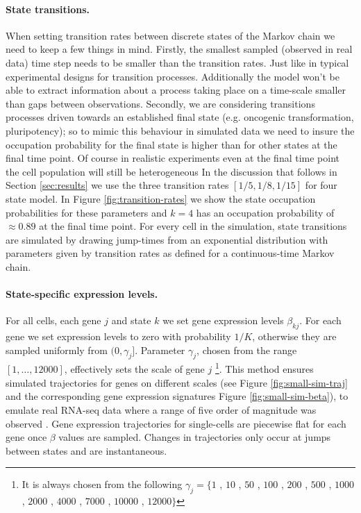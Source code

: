 \paragraph{State transitions.}
\label{sec:state-transitions}
When setting transition rates between discrete states of the Markov chain we need to keep a few things in mind. Firstly, the smallest sampled (observed in real data) time step needs to be smaller than the transition rates. Just like in typical experimental designs for transition processes. Additionally the model won't be able to extract information about a process taking place on a time-scale smaller than gaps between observations. Secondly, we are considering transitions processes driven towards an established final state (e.g. oncogenic transformation, pluripotency); so to mimic this behaviour in simulated data we need to insure the occupation probability for the final state is higher than for other states at the final time point. Of course in realistic experiments even at the final time point the cell population will still be heterogeneous In the discussion that follows in Section \ref{sec:results} we use the three transition rates $[1/5, 1/8, 1/15]$ for four state model. In Figure \ref{fig:transition-rates} we show the state occupation probabilities for these parameters and $k=4$ has an occupation probability of $\approx 0.89$ at the final time point. For every cell in the simulation, state transitions are simulated by drawing jump-times from an exponential distribution with parameters given by transition rates as defined for a continuous-time Markov chain.

\paragraph{State-specific expression levels.}
\label{sec:state-spec-expr}
For all cells, each gene $j$ and state $k$ we set gene expression levels $\beta_{kj}$. For each gene we set expression levels to zero with probability $1/K$, otherwise they are sampled uniformly from $(0, \gamma_j]$. Parameter $\gamma_j$, chosen from the range $[1, \ldots, 12000]$, effectively sets the scale of gene $j$ \footnote{It is always chosen from the following $\gamma_j = \lbrace 1$ , $ 10$ , $ 50$ , $ 100$ , $ 200$ , $ 500$ , $ 1000$ , $ 2000$ , $ 4000$ , $ 7000$ , $ 10000$ , $ 12000 \rbrace$}. This method ensures simulated trajectories for genes on different scales (see Figure \ref{fig:small-sim-traj} and the corresponding gene expression signatures Figure \ref{fig:small-sim-beta}), to emulate real RNA-seq data  where a range of five order of magnitude was observed \citep{Wang:2009ur,Mortazavi:2008jj}. Gene expression trajectories for single-cells are piecewise flat for each gene once $\beta$ values are sampled. Changes in trajectories only occur at jumps between states and are instantaneous.

